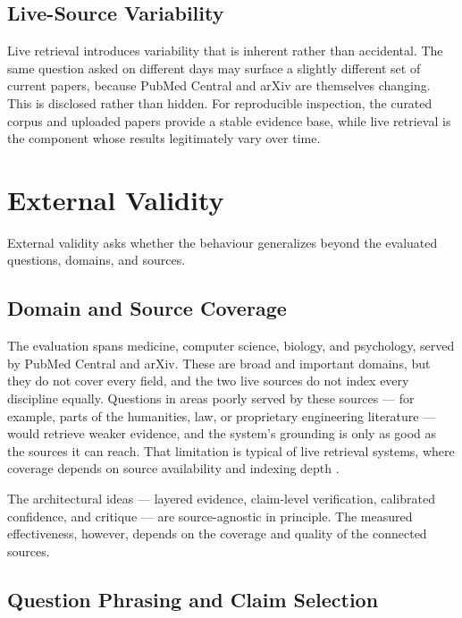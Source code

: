 \subsection{Live-Source Variability }

Live retrieval introduces variability that is inherent rather than accidental. The same question asked on different
days may surface a slightly different set of current papers, because PubMed Central and arXiv are themselves
changing. This is disclosed rather than hidden. For reproducible inspection, the curated corpus and uploaded papers
provide a stable evidence base, while live retrieval is the component whose results legitimately vary over time.

\section{External Validity }

External validity asks whether the behaviour generalizes beyond the evaluated questions, domains, and sources.

\subsection{Domain and Source Coverage }

The evaluation spans medicine, computer science, biology, and psychology, served by PubMed Central and arXiv. These
are broad and important domains, but they do not cover every field, and the two live sources do not index every
discipline equally. Questions in areas poorly served by these sources --- for example, parts of the humanities, law,
or proprietary engineering literature --- would retrieve weaker evidence, and the system's grounding is only as good
as the sources it can reach. That limitation is typical of live retrieval systems, where coverage depends on source
availability and indexing depth \cite{gu2021pubmedbert,lee2019biobert,ragsurvey2024,petroni2020kilt}.

The architectural ideas --- layered evidence, claim-level verification, calibrated confidence, and critique --- are
source-agnostic in principle. The measured effectiveness, however, depends on the coverage and quality of the
connected sources.

\subsection{Question Phrasing and Claim Selection }

